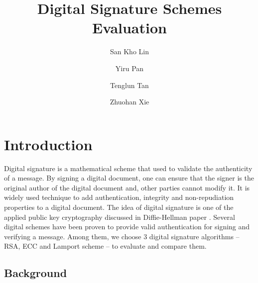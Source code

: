 \documentclass[10pt,sigconf]{acmart}
\begin{document}
\newpage




\title{Digital Signature Schemes Evaluation}


\author{San Kho Lin}

\author{Yiru Pan}

\author{Tenglun Tan}

\author{Zhuohan Xie}



\maketitle

\section{Introduction}

Digital signature is a mathematical scheme that used to validate the authenticity of a message. By signing a digital document, one can ensure that the signer is the original author of the digital document and, other parties cannot modify it. It is widely used technique to add authentication, integrity and non-repudiation properties to a digital document. The idea of digital signature is one of the applied public key cryptography discussed in Diffie-Hellman paper \cite{Diffie:2006:NDC:2263321.2269104}. Several digital schemes have been proven to provide valid authentication for signing and verifying a message. Among them, we choose 3 digital signature algorithms -- RSA, ECC and Lamport scheme -- to evaluate and compare them.

\subsection{Background}
\end{document}

